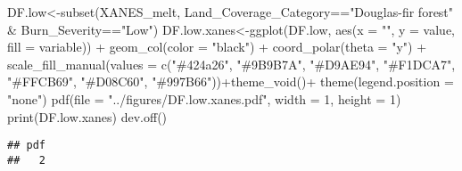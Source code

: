 \documentclass[
]{article}
\newenvironment{Shaded}{\begin{snugshade}}{\end{snugshade}}
\newcommand{\AttributeTok}[1]{\textcolor[rgb]{0.77,0.63,0.00}{#1}}
\newcommand{\DecValTok}[1]{\textcolor[rgb]{0.00,0.00,0.81}{#1}}
\newcommand{\FunctionTok}[1]{\textcolor[rgb]{0.00,0.00,0.00}{#1}}
\newcommand{\NormalTok}[1]{#1}
\newcommand{\OtherTok}[1]{\textcolor[rgb]{0.56,0.35,0.01}{#1}}
\newcommand{\SpecialCharTok}[1]{\textcolor[rgb]{0.00,0.00,0.00}{#1}}
\newcommand{\StringTok}[1]{\textcolor[rgb]{0.31,0.60,0.02}{#1}}
\begin{document}
\begin{Shaded}
\begin{Highlighting}[]
\NormalTok{DF.low}\OtherTok{\textless{}{-}}\FunctionTok{subset}\NormalTok{(XANES\_melt, Land\_Coverage\_Category}\SpecialCharTok{==}\StringTok{"Douglas{-}fir forest"} \SpecialCharTok{\&}\NormalTok{ Burn\_Severity}\SpecialCharTok{==}\StringTok{"Low"}\NormalTok{)}
\NormalTok{DF.low.xanes}\OtherTok{\textless{}{-}}\FunctionTok{ggplot}\NormalTok{(DF.low, }\FunctionTok{aes}\NormalTok{(}\AttributeTok{x =} \StringTok{""}\NormalTok{, }\AttributeTok{y =}\NormalTok{ value, }\AttributeTok{fill =}\NormalTok{ variable)) }\SpecialCharTok{+}
    \FunctionTok{geom\_col}\NormalTok{(}\AttributeTok{color =} \StringTok{"black"}\NormalTok{) }\SpecialCharTok{+}
    \FunctionTok{coord\_polar}\NormalTok{(}\AttributeTok{theta =} \StringTok{"y"}\NormalTok{) }\SpecialCharTok{+} \FunctionTok{scale\_fill\_manual}\NormalTok{(}\AttributeTok{values =} \FunctionTok{c}\NormalTok{(}\StringTok{"\#424a26"}\NormalTok{, }\StringTok{"\#9B9B7A"}\NormalTok{, }\StringTok{"\#D9AE94"}\NormalTok{, }\StringTok{"\#F1DCA7"}\NormalTok{, }\StringTok{"\#FFCB69"}\NormalTok{, }\StringTok{"\#D08C60"}\NormalTok{, }\StringTok{"\#997B66"}\NormalTok{))}\SpecialCharTok{+}\FunctionTok{theme\_void}\NormalTok{()}\SpecialCharTok{+}
    \FunctionTok{theme}\NormalTok{(}\AttributeTok{legend.position =} \StringTok{"none"}\NormalTok{)}
\FunctionTok{pdf}\NormalTok{(}\AttributeTok{file =} \StringTok{"../figures/DF.low.xanes.pdf"}\NormalTok{, }\AttributeTok{width =} \DecValTok{1}\NormalTok{, }\AttributeTok{height =} \DecValTok{1}\NormalTok{) }
\FunctionTok{print}\NormalTok{(DF.low.xanes)}
\FunctionTok{dev.off}\NormalTok{()}
\end{Highlighting}
\end{Shaded}

\begin{verbatim}
## pdf 
##   2
\end{verbatim}
\end{document}
